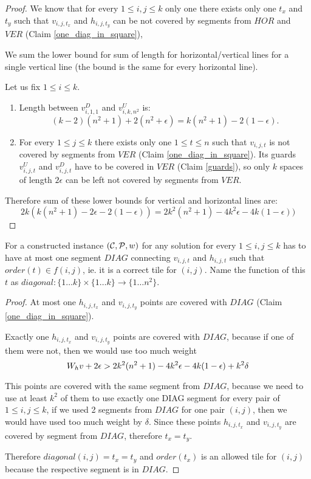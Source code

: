 \begin{proof}
We know that for every $1 \le i,j \le k$
only one there exists only one $t_x$ and $t_y$ such that
$v_{i,j,t_x}$ and $h_{i,j,t_y}$
can be not covered by
segments from $HOR$ and $VER$ (Claim \ref{one_diag_in_square}),


We sum the lower bound for sum of length for horizontal/vertical
lines for a single vertical line
(the bound is the same for every horizontal line).

Let us fix $1 \le i \le k$.

\begin{enumerate}
\item Length between $v^D_{i, 1, 1}$ and $v^U_{i, k, n^2}$ is:
$$(k-2)(n^2+1) + 2(n^2 + \epsilon) = k(n^2+1) - 2(1 - \epsilon).$$

\item For every $1 \le j \le k$ there exists only one $1 \le t \le n$
such that $v_{i,j,t}$ is not covered by segments from $VER$
(Claim \ref{one_diag_in_square}).
Its guards $v^U_{i,j,t}$ and $v^D_{i,j,t}$
have to be covered in $VER$ (Claim \ref{guards}),
so only $k$ spaces of length $2\epsilon$ can be left
not covered by segments from $VER$.

\end{enumerate}
Therefore sum of these lower bounds for vertical and horizontal lines are:
$$2k(k(n^2+1) -2\epsilon -2(1-\epsilon)) = 2k^2(n^2+1) -4k^2\epsilon -4k(1-\epsilon))$$
\end{proof}

\begin{lemma}
\label{diag_correct}
For a constructed instance $(\mathcal{C}, \mathcal{P}, w)$
for any solution for every $1 \le i,j \le k$
has to have at most one segment $DIAG$
connecting $v_{i,j,t}$ and $h_{i,j,t}$
such that $order(t) \in f(i, j)$,
ie. it is a correct tile for $(i,j)$.
Name the function of this $t$ as
$diagonal : \{1 \ldots k\} \times \{1 \ldots k\} \rightarrow \{1 \ldots n^2\}$.
\end{lemma}

\begin{proof}
At most one $h_{i,j,t_x}$ and $v_{i,j,t_y}$
points are covered with $DIAG$
(Claim \ref{one_diag_in_square}).
	
Exactly one $h_{i,j,t_x}$ and $v_{i,j,t_y}$
points are covered with $DIAG$,
because if one of them were not, then we would use too much weight
$$W_hv + 2\epsilon > 2k^2(n^2+1) - 4k^2\epsilon -4k(1-\epsilon) +k^2\delta$$

This points are covered with the same segment from $DIAG$,
because we need to use at least $k^2$ of them to use
exactly one DIAG segment for every pair of $1 \le i,j \le k$,
if we used 2 segments from $DIAG$
for one pair $(i,j)$,
then we would have used too much weight by $\delta$.
Since these points $h_{i,j,t_x}$ and $v_{i,j,t_y}$ are covered by
segment from $DIAG$, therefore $t_x = t_y$.

Therefore $diagonal(i,j) = t_x = t_y$
and $order(t_x)$ is an allowed tile for $(i,j)$
because the respective segment is in $DIAG$.

\end{proof}

